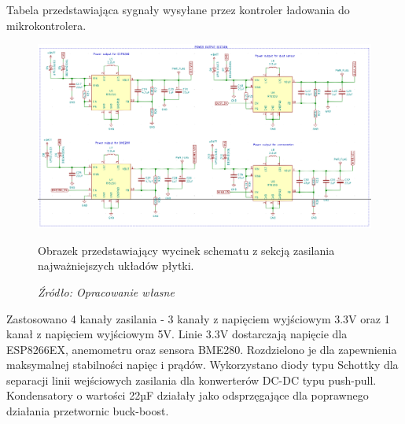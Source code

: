 \documentclass[12pt,a4paper,oneside]{memoir}
\begin{document}
\begin{table}[!h]
	\centering
	{\tytulyrozdzialow \footnotesize \caption[LT3652 - Sygnały statusu] {Tabela przedstawiająca sygnały wysyłane przez kontroler ładowania do mikrokontrolera.}}
	\caption*{\textit{Źródło: \cite{lt3652}}}
\end{table}
\newpage
\begin{figure}[!h]
	\centering
	\includegraphics[scale=0.35]{images/sch/sch-05.png}
	{\tytulyrozdzialow \footnotesize \caption[Schemat - sekcja zasilania] {Obrazek przedstawiający wycinek schematu z sekcją zasilania najważniejszych układów płytki.}}
	\caption*{\textit{Źródło: Opracowanie własne}}
\end{figure}
\par Zastosowano 4 kanały zasilania - 3 kanały z napięciem wyjściowym 3.3V oraz 1 kanał z napięciem wyjściowym 5V. Linie 3.3V dostarczają napięcie dla ESP8266EX, anemometru oraz sensora BME280. Rozdzielono je dla zapewnienia maksymalnej stabilności napięc i prądów. Wykorzystano diody typu Schottky dla separacji linii wejściowych zasilania dla konwerterów DC-DC typu push-pull. Kondensatory o wartości 22µF działały jako odsprzęgające dla poprawnego działania przetwornic buck-boost. 
\end{document}
